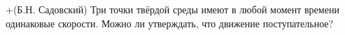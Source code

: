 +(Б.Н. Садовский)
Три точки твёрдой среды имеют в любой момент времени одинаковые
скорости. Можно ли утверждать, что движение поступательное?
